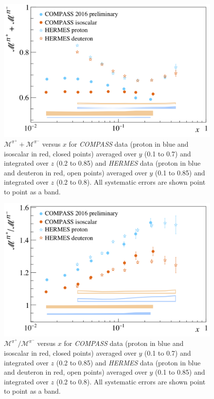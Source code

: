 \documentclass[letterpaper,12pt]{article}
\begin{document}
\newpage

\begin{figure}[H]
	\centering
	\includegraphics[scale=0.55]{./gfx/Pis.png}
	\caption{$\mathscr{M}^{\pi^+}+\mathscr{M}^{\pi^-}$ versus $x$ for \textit{COMPASS} data (proton in blue and isoscalar in red, closed points) averaged over $y$ (0.1 to 0.7) and integrated over $z$ (0.2 to 0.85) and \textit{HERMES} data \cite{HERMES} (proton in blue and deuteron in red, open points) averaged over $y$ (0.1 to 0.85) and integrated over $z$ (0.2 to 0.8). All systematic errors are shown point to point as a band.}
	\label{Pis}
\end{figure}

\begin{figure}[H]
	\centering
	\includegraphics[scale=0.55]{./gfx/Pir.png}
	\caption{$\mathscr{M}^{\pi^+}/\mathscr{M}^{\pi^-}$ versus $x$ for \textit{COMPASS} data (proton in blue and isoscalar in red, closed points) averaged over $y$ (0.1 to 0.7) and integrated over $z$ (0.2 to 0.85) and \textit{HERMES} data \cite{HERMES} (proton in blue and deuteron in red, open points) averaged over $y$ (0.1 to 0.85) and integrated over $z$ (0.2 to 0.8). All systematic errors are shown point to point as a band.}
	\label{Pir}
\end{figure}
\end{document}
